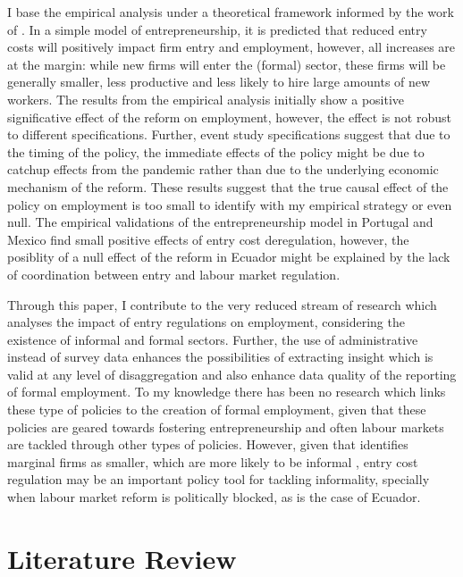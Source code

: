 \documentclass[11pt,a4paper]{article}\usepackage[]{graphicx}\usepackage[]{xcolor}
\begin{document}
I base the empirical analysis under a theoretical framework informed by the work of \textcite{Branstetter.2014}. In a simple model of entrepreneurship, it is predicted that reduced entry costs will positively impact firm entry and employment, however, all increases are at the margin: while new firms will enter the (formal) sector, these firms will be generally smaller, less productive and less likely to hire large amounts of new workers. The results from the empirical analysis initially show a positive significative effect of the reform on employment, however, the effect is not robust to different specifications. Further, event study specifications suggest that due to the timing of the policy, the immediate effects of the policy might be due to catchup effects from the pandemic rather than due to the underlying economic mechanism of the reform. These results suggest that the true causal effect of the policy on employment is too small to identify with my empirical strategy or even null. The empirical validations of the entrepreneurship model \textcite{Branstetter.2014} in Portugal \parencite{Branstetter.2014} and Mexico \parencite{Kaplan.2011} find small positive effects of entry cost deregulation, however, the posiblity of a null effect of the reform in Ecuador might be explained by the lack of coordination between entry and labour market regulation. 

Through this paper, I contribute to the very reduced stream of research which analyses the impact of entry regulations on employment, considering the existence of informal and formal sectors. Further, the use of administrative instead of survey data enhances the possibilities of extracting insight which is valid at any level of disaggregation and also enhance data quality of the reporting of formal employment. To my knowledge there has been no research which links these type of policies to the creation of formal employment, given that these policies are geared towards fostering entrepreneurship and often labour markets are tackled through other types of policies. However, given that \textcite{Branstetter.2014} identifies marginal firms as smaller, which are more likely to be informal \parencite{ElianeElBadaoui.2010}, entry cost regulation may be an important policy tool for tackling informality, specially when labour market reform is politically blocked, as is the case of Ecuador. 

\section{Literature Review}
\end{document}
